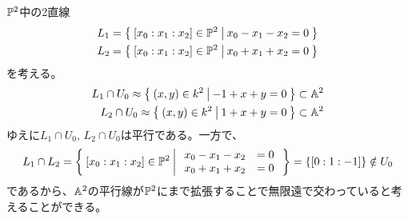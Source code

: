 \documentclass{ltjsreport}
\begin{document}
\begin{eg}
  $\mathbb{P}^2$中の2直線
  \begin{align*}
    L_1=\left\{\:[x_0:x_1:x_2]\in\mathbb{P}^2\:\middle|\:x_0-x_1-x_2=0\:\right\}\\
    L_2=\left\{\:[x_0:x_1:x_2]\in\mathbb{P}^2\:\middle|\:x_0+x_1+x_2=0\:\right\}
  \end{align*}
  を考える。
  \begin{align*}
    L_1\cap U_0\approx\left\{\:(x,y)\in k^2\:\middle|\:-1+x+y=0\:\right\}\subset\mathbb{A}^2\\
    L_2\cap U_0\approx\left\{\:(x,y)\in k^2\:\middle|\:1+x+y=0\:\right\}\subset\mathbb{A}^2
  \end{align*}
  ゆえに$L_1\cap U_0$, $L_2\cap U_0$は平行である。一方で、
  \[
  L_1\cap L_2=\left\{\:[x_0:x_1:x_2]\in\mathbb{P}^2\:\middle|\:
    \begin{array}{cc}
      x_0-x_1-x_2 & =0\\
      x_0+x_1+x_2 & =0
    \end{array}\:\right\}=\{[0:1:-1]\}\notin U_0
  \]
  であるから、$\mathbb{A}^2$の平行線が$\mathbb{P}^2$にまで拡張することで無限遠で交わっていると考えることができる。
\end{eg}
\end{document}
